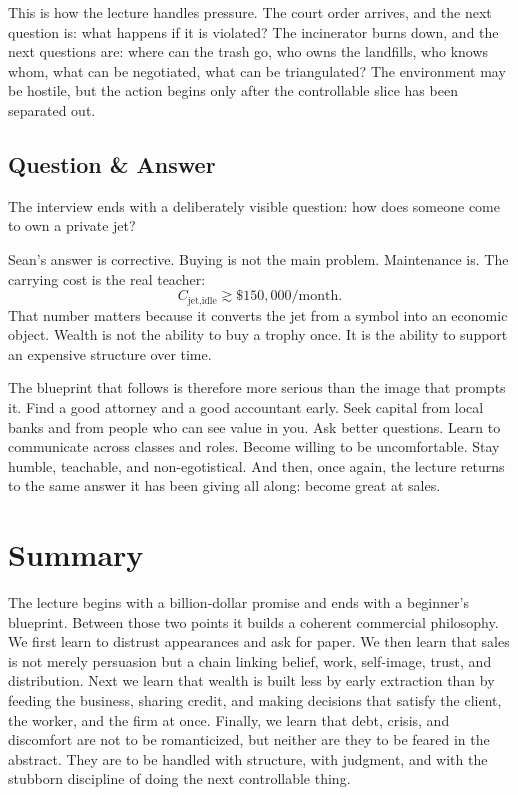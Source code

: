This is how the lecture handles pressure. The court order arrives, and the next question is: what happens if it is violated? The incinerator burns down, and the next questions are: where can the trash go, who owns the landfills, who knows whom, what can be negotiated, what can be triangulated? The environment may be hostile, but the action begins only after the controllable slice has been separated out.

\subsection{Question \& Answer}

The interview ends with a deliberately visible question: how does someone come to own a private jet?

Sean's answer is corrective. Buying is not the main problem. Maintenance is. The carrying cost is the real teacher:
\begin{equation}
C_{\text{jet,idle}} \gtrsim \$150{,}000/\text{month}.
\end{equation}
That number matters because it converts the jet from a symbol into an economic object. Wealth is not the ability to buy a trophy once. It is the ability to support an expensive structure over time.

The blueprint that follows is therefore more serious than the image that prompts it. Find a good attorney and a good accountant early. Seek capital from local banks and from people who can see value in you. Ask better questions. Learn to communicate across classes and roles. Become willing to be uncomfortable. Stay humble, teachable, and non-egotistical. And then, once again, the lecture returns to the same answer it has been giving all along: become great at sales.

\section{Summary}

The lecture begins with a billion-dollar promise and ends with a beginner's blueprint. Between those two points it builds a coherent commercial philosophy. We first learn to distrust appearances and ask for paper. We then learn that sales is not merely persuasion but a chain linking belief, work, self-image, trust, and distribution. Next we learn that wealth is built less by early extraction than by feeding the business, sharing credit, and making decisions that satisfy the client, the worker, and the firm at once. Finally, we learn that debt, crisis, and discomfort are not to be romanticized, but neither are they to be feared in the abstract. They are to be handled with structure, with judgment, and with the stubborn discipline of doing the next controllable thing.